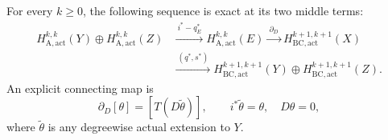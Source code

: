 \begin{theorem}
\label{r13d:connecting}
For every $k\geq0$, the following sequence is exact at its two
middle terms:
\[
\begin{split}
 H_{\mathrm A,\mathrm{act}}^{k,k}(Y)\oplus
 H_{\mathrm A,\mathrm{act}}^{k,k}(Z)
 &\xrightarrow{\ i^*-q_E^*\ }
 H_{\mathrm A,\mathrm{act}}^{k,k}(E)
 \xrightarrow{\ \partial_D\ }
 H_{\mathrm{BC,act}}^{k+1,k+1}(X)\\
 &\xrightarrow{\ (q^*,s^*)\ }
 H_{\mathrm{BC,act}}^{k+1,k+1}(Y)\oplus
 H_{\mathrm{BC,act}}^{k+1,k+1}(Z).
\end{split}
\tag{R13.D16}\label{r13d:connecting-sequence}
\]
An explicit connecting map is
\[
               \partial_D[\theta]=[T(D\widetilde\theta)],
       \qquad i^*\widetilde\theta=\theta,\quad D\theta=0,
\tag{R13.D17}\label{r13d:connecting-formula}
\]
where $\widetilde\theta$ is any degreewise actual extension to $Y$.
\end{theorem}

